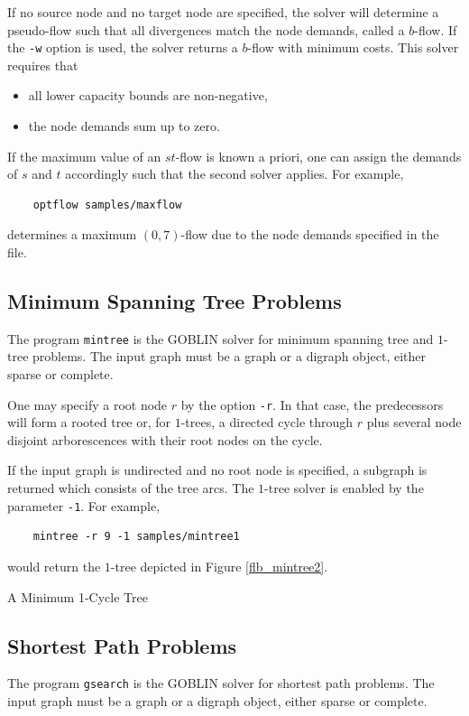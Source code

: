 \documentclass[a4paper,11pt,twoside]{book}
\begin{document}
\begin{multicols}{2}
If no source node and no target node are specified, the solver will determine
a pseudo-flow such that all divergences match the node demands, called a
$b$-flow. If the \verb/-w/ option is used, the solver returns a $b$-flow with
minimum costs.  This solver requires that
\begin{itemize}
\item all lower capacity bounds are non-negative,
\item the node demands sum up to zero.
\end{itemize}
If the maximum value of an $st$-flow is known a priori, one can assign
the demands of $s$ and $t$ accordingly such that the second solver applies.
For example,
\begin{verbatim}
    optflow samples/maxflow
\end{verbatim}
determines a maximum $(0,7)$-flow due to the node demands specified in the file.


\subsection{Minimum Spanning Tree Problems}
The program \verb/mintree/ is the GOBLIN solver for minimum spanning tree and
$1$-tree problems. The input graph must be a graph or a digraph object, either
sparse or complete.

One may specify a root node $r$ by the option \verb/-r/. In that case, the
predecessors will form a rooted tree or, for $1$-trees, a directed cycle
through $r$ plus several node disjoint arborescences with their root nodes on
the cycle.

If the input graph is undirected and no root node is specified, a subgraph is
returned which consists of the tree arcs. The $1$-tree solver is enabled by
the parameter \verb/-1/. For example,
\begin{verbatim}
    mintree -r 9 -1 samples/mintree1
\end{verbatim}
would return the $1$-tree depicted in Figure \ref{flb_mintree2}.

\bigskip
\begin{figurehere}
\begin{center}
\epsfxsize=8cm
\vspace{0.5cm}
\caption{\label{flb_mintree2}A Minimum 1-Cycle Tree}
\end{center}
\end{figurehere}


\subsection{Shortest Path Problems}
The program \verb/gsearch/ is the GOBLIN solver for shortest path problems.
The input graph must be a graph or a digraph object, either sparse or complete.


\end{multicols}
\end{document}
